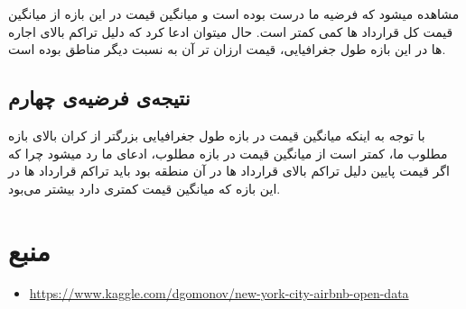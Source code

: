 \documentclass[table]{article}
\begin{document}
	مشاهده میشود که فرضیه ما درست بوده است و میانگین قیمت در این بازه از میانگین قیمت کل قرارداد ها کمی کمتر است. حال میتوان ادعا کرد که دلیل تراکم بالای اجاره ها در این بازه طول جغرافیایی، قیمت ارزان تر آن به نسبت دیگر مناطق بوده است.
	\subsection{نتیجه‌ی فرضیه‌ی چهارم}
	با توجه به اینکه میانگین قیمت در بازه طول جغرافیایی بزرگتر از کران بالای بازه مطلوب ما، کمتر است از میانگین قیمت در بازه مطلوب، ادعای ما رد میشود چرا که اگر قیمت پایین دلیل تراکم بالای قرارداد ها در آن منطقه بود باید تراکم قرارداد ها در این بازه که میانگین قیمت کمتری دارد بیشتر  می‌بود.
	
	\section{منبع}
	\begin{itemize}
		\item \url{https://www.kaggle.com/dgomonov/new-york-city-airbnb-open-data}
	\end{itemize}
\end{document}
